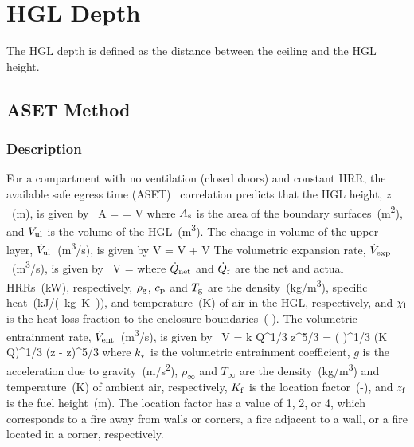 
\chapter{HGL Depth}
\label{HGL_Depth_Chapter}

The HGL depth is defined as the distance between the ceiling and the HGL height.

\section{ASET Method}

\subsection*{Description}

For a compartment with no ventilation (closed doors) and constant HRR, the available safe egress time (ASET)~\cite{Walton:1}
correlation predicts that the HGL height, $z$~(\si{m}), is given by~\cite{SFPE:Milke}
\be
A  =  = \dot V
\label{eq:ASET_1}
\ee
where $A\sb{s}$ is the area of the boundary surfaces~(\si{m^2}), and $V\sb{ul}$ is the volume of the HGL~(\si{m^3}).
The change in volume of the upper layer, $\dot V\sb{ul}$~(\si{m^3/s}), is given by
\be
\dot V = \dot V + \dot V
\label{eq:ASET_2}
\ee
The volumetric expansion rate, $\dot V\sb{exp}$~(\si{m^3/s}), is given by~\cite{SFPE:Mowrer}
\be
\dot V =  \approx {}
\label{eq:ASET_3}
\ee
where $\dot Q\sb{net}$ and $\dot Q\sb{f}$ are the net and actual HRRs~(\si{kW}), respectively, $\rho\sb{g}$, $c\sb{p}$ and $T\sb{g}$ are the density~(\si{kg/m^3}), specific heat~(\si{kJ/(kg.K)}), and temperature~(\si{K}) of air in the HGL, respectively, and $\chi\sb{l}$ is the heat loss fraction to the enclosure boundaries~(-).
The volumetric entrainment rate, $\dot V\sb{ent}$~(\si{m^3/s}), is given by~\cite{Zukoski:1981}
\be
\dot V = k \dot Q^{1/3} z^{5/3} =  \left(  \right)^{1/3} (K \dot Q)^{1/3} (z - z)^{5/3}
\label{eq:ASET_4}
\ee
where $k\sb{v}$ is the volumetric entrainment coefficient, $g$ is the acceleration due to gravity~(\si{m/s^2}), $\rho_\infty$ and $T_\infty$ are the density~(\si{kg/m^3}) and temperature~(\si{K}) of ambient air, respectively, $K\sb{f}$ is the location factor~(-), and $z\sb{f}$ is the fuel height~(\si{m}). The location factor has a value of 1, 2, or 4, which corresponds to a fire away from walls or corners, a fire adjacent to a wall, or a fire located in a corner, respectively.

